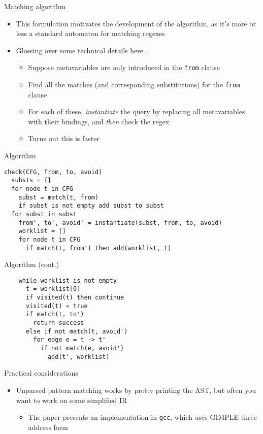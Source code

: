 \documentclass{beamer}
\begin{document}
\begin{frame}{Matching algorithm}
\begin{itemize}
\item This formulation motivates the development of the algorithm, as it's
more or less a standard automaton for matching regexes
\item Glossing over some technical details here...
\begin{itemize}
\item Suppose metavariables are only introduced in the {\tt from} clause
\item Find all the matches (and corresponding substitutions) for the
{\tt from} clause
\item For each of these, \emph{instantiate} the query by replacing all
metavariables with their bindings, and \emph{then} check the regex
\item Turns out this is faster
\end{itemize}
\end{itemize}
\end{frame}

\begin{frame}[fragile]{Algorithm}
\begin{verbatim}
check(CFG, from, to, avoid)
  substs = {}
  for node t in CFG
    subst = match(t, from)
    if subst is not empty add subst to subst
  for subst in subst
    from', to', avoid' = instantiate(subst, from, to, avoid)
    worklist = []
    for node t in CFG
      if match(t, from') then add(worklist, t)
\end{verbatim}
\end{frame}

\begin{frame}[fragile]{Algorithm (cont.)}
\begin{verbatim}
    while worklist is not empty
      t = worklist[0]
      if visited(t) then continue
      visited(t) = true
      if match(t, to')
        return success
      else if not match(t, avoid')
        for edge e = t -> t'
          if not match(e, avoid')
            add(t', worklist)
\end{verbatim}
\end{frame}

\begin{frame}{Practical considerations}
\begin{itemize}
\item Unparsed pattern matching works by pretty printing the AST, but often
you want to work on some simplified IR
\begin{itemize}
\item The paper presents an implementation in {\tt gcc}, which uses
GIMPLE three-address form
\end{itemize}
\end{itemize}
\end{frame}
\end{document}
